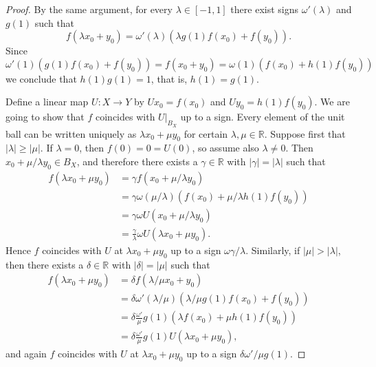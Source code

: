 \documentclass{memo-l}
\theoremstyle{definition}
\theoremstyle{remark}
\numberwithin{section}{chapter}
\numberwithin{equation}{chapter}
\newcommand\R{\ensuremath{\mathbb{R}}}
\begin{document}
\begin{proof}
    By the same argument, for every $\lambda \in [-1,1]$ there exist signs $\omega' (\lambda )$ and $g(1)$ such that
    \[
    f(\lambda x_0+y_0)=\omega '(\lambda )(\lambda g(1)f(x_0)+f(y_0)).
    \]
    Since
    \[
    \omega '(1)(g(1)f(x_0)+f(y_0))=f(x_0+y_0)=\omega
    (1)(f(x_0)+h(1)f(y_0))
    \]
    we conclude that $h(1)g(1)=1$, that is, $h(1)=g(1)$.

    Define a linear map $U\colon
    X\to Y$ by $Ux_0=f(x_0)$ and $Uy_0=h(1)f(y_0)$. We are going to
    show that $f$ coincides with $U|_{B_X}$ up to a sign. Every
    element of the unit ball can be written uniquely as $\lambda
    x_0+\mu y_0$ for certain $\lambda ,\mu \in \R$. Suppose first that
    $|\lambda |\ge |\mu |$. If $\lambda =0$, then $f(0)=0=U(0)$, so
    assume also $\lambda \neq 0$. Then $x_0+\mu /\lambda y_0 \in B_X$,
    and therefore there exists a $\gamma \in \R$ with $|\gamma
    |=|\lambda |$ such that
    \begin{align*}
        f(\lambda x_0+\mu y_0)&=\gamma f(x_0+\mu /\lambda y_0)\\
                              &=\gamma \omega (\mu /\lambda
                              )(f(x_0)+\mu /\lambda h(1)f(y_0))\\
                              &=\gamma \omega U(x_0+\mu /\lambda
                              y_0)\\
                              &=\frac{\gamma }{\lambda }\omega
                              U(\lambda x_0+\mu y_0).
    \end{align*}
    Hence $f$ coincides with $U$ at $\lambda x_0+\mu y_0$ up to a sign
    $\omega \gamma /\lambda $. Similarly, if $|\mu |>|\lambda |$, then
    there exists a $\delta \in \R$ with $|\delta |=|\mu|$ such
    that
    \begin{align*}
        f(\lambda x_0+\mu y_0)&=\delta f(\lambda /\mu x_0+y_0)\\
                              &=\delta \omega '(\lambda /\mu )(\lambda
                              /\mu g(1)f(x_0)+f(y_0))\\
                              &=\delta \frac{\omega '}{\mu
                              }g(1)(\lambda f(x_0)+\mu h(1)f(y_0))\\
                              &=\delta \frac{\omega '}{\mu
                              }g(1)U(\lambda x_0+\mu y_0),
    \end{align*}
    and again $f$ coincides with $U$ at $\lambda x_0+\mu y_0$ up to a
    sign $\delta \omega '/\mu g(1)$.


\end{proof}
\end{document}

